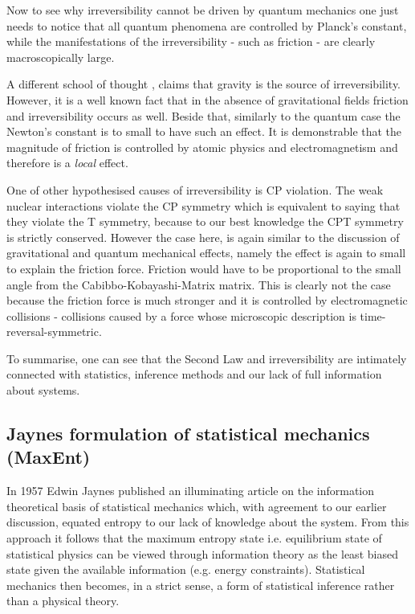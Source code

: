 \documentclass[a4paper,12pt]{article}
\begin{document}
Now to see why irreversibility cannot be driven by quantum mechanics one just needs to notice that all quantum phenomena are controlled by Planck's constant, while the manifestations of the irreversibility - such as friction - are clearly macroscopically large. %

A different school of thought \cite{KIEFER2005, Barbour:2014hq}, %
claims that gravity is the source of irreversibility. However, it is a well known fact that in the absence of gravitational fields friction and irreversibility occurs as well. Beside that, similarly to the quantum case the Newton's constant is to small to have such an effect. It is demonstrable that the magnitude of friction is controlled by atomic physics and electromagnetism and therefore is a \textit{local} effect. 

One of other hypothesised causes of irreversibility is CP violation. 
The weak nuclear interactions violate the CP symmetry which is equivalent to saying that they violate the T symmetry, because to our best knowledge the CPT symmetry is strictly conserved. However the case here, is again similar to the discussion of gravitational and quantum mechanical effects, namely the effect is again to small to explain the friction force. Friction would have to be proportional to the small angle from the Cabibbo-Kobayashi-Matrix matrix.
This is clearly not the case because the friction force is much stronger and it is controlled by electromagnetic collisions - collisions caused by a force whose microscopic description is time-reversal-symmetric.
 
To summarise, one can see that the Second Law and irreversibility are intimately connected with statistics, inference methods and our lack of full information about systems.

\subsection{Jaynes formulation of statistical mechanics (MaxEnt)}

In 1957 Edwin Jaynes published an illuminating article on the information theoretical basis of statistical mechanics which, with agreement to our earlier discussion, equated entropy to our lack of knowledge about the system. From this approach it follows that the maximum entropy state i.e. equilibrium state of statistical physics can be viewed through information theory as the least biased state given the available information (e.g. energy constraints).
Statistical mechanics then becomes, in a strict sense, a form of statistical inference rather than a physical theory.
\end{document}
